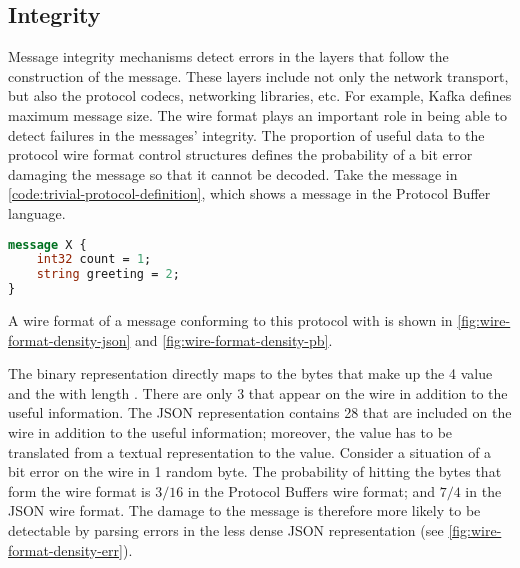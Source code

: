 \subsection{Integrity}
Message integrity mechanisms detect errors in the layers that follow the construction of the message. These layers include not only the network transport, but also the protocol codecs, networking libraries, etc. For example, Kafka\cite{apache-kafka} defines maximum message size. The wire format plays an important role in being able to detect failures in the messages' integrity. The proportion of useful data to the protocol wire format control structures defines the probability of a bit error damaging the message so that it cannot be decoded. Take the message in \autoref{code:trivial-protocol-definition}, which shows a message in the Protocol Buffer language.

\begin{lstlisting}[caption={Trivial protocol definition}, label={code:trivial-protocol-definition}, language=Protobuf]
message X {
    int32 count = 1;
    string greeting = 2; 
}
\end{lstlisting}

A wire format of a message conforming to this protocol with  is shown in \autoref{fig:wire-format-density-json} and \autoref{fig:wire-format-density-pb}.



The binary representation directly maps to the bytes that make up the \SI{4}{\byte}  value and the  with length . There are only \SI{3}{\byte} that appear on the wire in addition to the useful information. The JSON representation contains \SI{28}{\byte} that are included on the wire in addition to the useful information; moreover, the value  has to be translated from a textual representation to the  value. Consider a situation of a bit error on the wire in 1 random byte. The probability of hitting the bytes that form the wire format is $3/16$ in the Protocol Buffers wire format; and $7/4$ in the JSON wire format. The damage to the message is therefore more likely to be detectable by parsing errors in the less dense JSON representation (see \autoref{fig:wire-format-density-err}).


